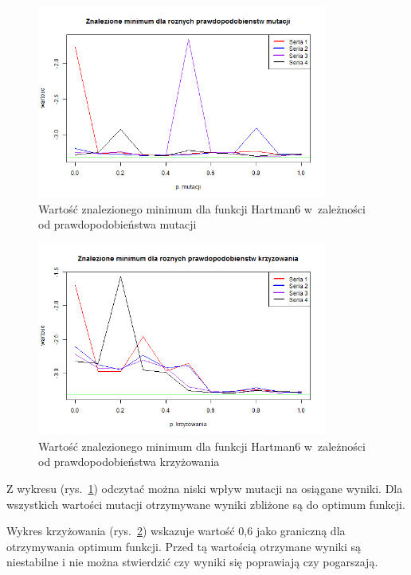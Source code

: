 \documentclass[11pt, a4paper]{article}
\newcommand{\fbi}{\leavevmode{\parindent=1em\indent}}
\begin{document}
\begin{figure}[H]
	\begin{center}
		\includegraphics[width=0.85\textwidth]{./assets/Hartman62.png}
		\caption{Wartość znalezionego minimum dla funkcji Hartman6 w~zależności od prawdopodobieństwa mutacji}
		\label{fig:hartman62}
	\end{center}
\end{figure}

\begin{figure}[H]
	\begin{center}
		\includegraphics[width=0.85\textwidth]{./assets/Hartman63.png}
		\caption{Wartość znalezionego minimum dla funkcji Hartman6 w~zależności od prawdopodobieństwa krzyżowania}
		\label{fig:hartman63}
	\end{center}
\end{figure}

\fbi
Z wykresu (rys.~\ref{fig:hartman62}) odczytać można niski wpływ mutacji na osiągane wyniki. Dla wszystkich wartości mutacji otrzymywane wyniki zbliżone są do optimum funkcji.

\fbi
Wykres krzyżowania (rys.~\ref{fig:hartman63}) wskazuje wartość 0,6 jako graniczną dla otrzymywania optimum funkcji. Przed tą wartością otrzymane wyniki są niestabilne i nie można stwierdzić czy wyniki się poprawiają czy pogarszają.
\end{document}
